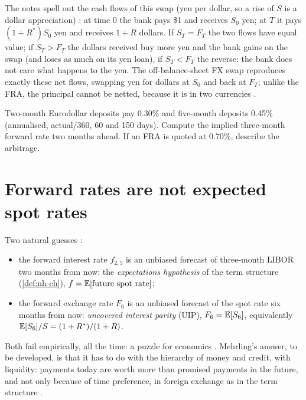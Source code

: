 \begin{paracol}{2}
\begin{taccts}
\qquad
{}
\end{taccts}

The notes spell out the cash flows of this swap (yen per dollar, so a rise of $S$ is a dollar appreciation) : at time 0 the bank pays \$1 and receives
$S_0$ yen; at $T$ it pays $(1+R^\ast)S_0$ yen and receives $1+R$ dollars. If $S_T=F_T$ the two flows have equal value; if $S_T>F_T$ the dollars received buy more yen and the
bank gains on the swap (and loses as much on its yen loan), if $S_T<F_T$ the reverse: the bank does not care what happens to the yen. The off-balance-sheet FX swap
reproduces exactly these net flows, swapping yen for dollars at $S_0$ and back at $F_T$; unlike the FRA, the principal cannot be netted, because it is in two currencies
.

\begin{exercise}
Two-month Eurodollar deposits pay 0.30\% and five-month deposits 0.45\% (annualised, actual/360, 60 and 150 days). Compute the implied three-month forward rate two months ahead. If an
FRA is quoted at 0.70\%, describe the arbitrage.
\end{exercise}

\section{Forward rates are not expected spot rates}\label{sec:ed-eh}

Two natural guesses :
\begin{itemize}
  \item the forward interest rate $f_{2,5}$ is an unbiased forecast of three-month LIBOR two months from now: the \emph{expectations hypothesis} of the term structure
        (\cref{def:nh-eh}), $f = \mathbb{E}[\text{future spot rate}]$;
  \item the forward exchange rate $F_6$ is an unbiased forecast of the spot rate six months from now: \emph{uncovered interest parity} (UIP), $F_6 = \mathbb{E}[S_6]$, equivalently
        $\mathbb{E}[S_6]/S = (1+R^\ast)/(1+R)$.
\end{itemize}
Both fail empirically, all the time: a puzzle for economics . Mehrling's answer, to be developed, is that it has to do with the hierarchy of money and credit, with
liquidity: payments today are worth more than promised payments in the future, and not only because of time preference, in foreign exchange as in the term structure .


\end{paracol}
